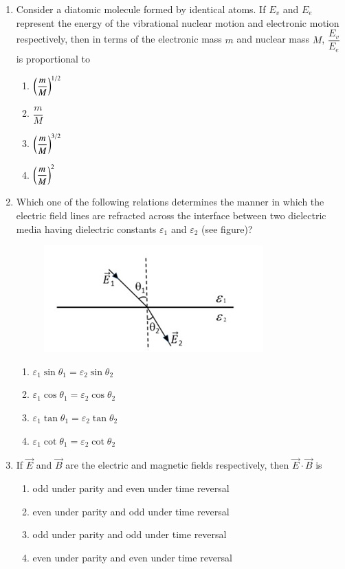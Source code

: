 \documentclass[journal,12pt,onecolumn]{IEEEtran}
\theoremstyle{remark}
\begin{document}
\begin{enumerate}
    \item Consider a diatomic molecule formed by identical atoms. If $E_v$ and $E_e$ represent the energy of the vibrational nuclear motion and electronic motion respectively, then in terms of the electronic mass $m$ and nuclear mass $M$, $\dfrac{E_v}{E_e}$ is proportional to
   
    \begin{enumerate}
        \item $\left(\dfrac{m}{M}\right)^{1/2}$
        \item $\dfrac{m}{M}$
        \item $\left(\dfrac{m}{M}\right)^{3/2}$
        \item $\left(\dfrac{m}{M}\right)^{2}$
    \end{enumerate}
    
    \item Which one of the following relations determines the manner in which the electric field lines are refracted across the interface between two dielectric media having dielectric constants $\varepsilon_1$ and $\varepsilon_2$ (see figure)?
 \begin{figure}[H]
    \centering
    \includegraphics[width=0.4\columnwidth]{fig/Q13.png}
     \caption*{}
    \label{fig:Q13}
\end{figure}
    \begin{enumerate}
        \item $\varepsilon_1 \sin\theta_1 = \varepsilon_2 \sin\theta_2$
        \item $\varepsilon_1 \cos\theta_1 = \varepsilon_2 \cos\theta_2$
        \item $\varepsilon_1 \tan\theta_1 = \varepsilon_2 \tan\theta_2$
        \item $\varepsilon_1 \cot\theta_1 = \varepsilon_2 \cot\theta_2$
    \end{enumerate}
    

    \item If $\vec{E}$ and $\vec{B}$ are the electric and magnetic fields respectively, then $\vec{E} \cdot \vec{B}$ is
   
    \begin{enumerate}
        \item odd under parity and even under time reversal
        \item even under parity and odd under time reversal
        \item odd under parity and odd under time reversal
        \item even under parity and even under time reversal
    \end{enumerate}
    


\end{enumerate}
\end{document}
